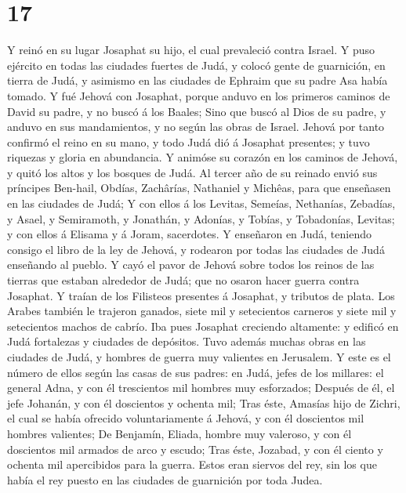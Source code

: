 \hypertarget{section-16}{%
\section{17}\label{section-16}}

 Y reinó en su lugar Josaphat su hijo, el cual prevaleció
contra Israel.  Y puso ejército en todas las ciudades
fuertes de Judá, y colocó gente de guarnición, en tierra de Judá, y
asimismo en las ciudades de Ephraim que su padre Asa había tomado.
 Y fué Jehová con Josaphat, porque anduvo en los primeros
caminos de David su padre, y no buscó á los Baales;  Sino
que buscó al Dios de su padre, y anduvo en sus mandamientos, y no según
las obras de Israel.  Jehová por tanto confirmó el reino en
su mano, y todo Judá dió á Josaphat presentes; y tuvo riquezas y gloria
en abundancia.  Y animóse su corazón en los caminos de
Jehová, y quitó los altos y los bosques de Judá.  Al tercer
año de su reinado envió sus príncipes Ben-hail, Obdías, Zachârías,
Nathaniel y Michêas, para que enseñasen en las ciudades de Judá;
 Y con ellos á los Levitas, Semeías, Nethanías, Zebadías, y
Asael, y Semiramoth, y Jonathán, y Adonías, y Tobías, y Tobadonías,
Levitas; y con ellos á Elisama y á Joram, sacerdotes.  Y
enseñaron en Judá, teniendo consigo el libro de la ley de Jehová, y
rodearon por todas las ciudades de Judá enseñando al pueblo.
 Y cayó el pavor de Jehová sobre todos los reinos de las
tierras que estaban alrededor de Judá; que no osaron hacer guerra contra
Josaphat.  Y traían de los Filisteos presentes á Josaphat,
y tributos de plata. Los Arabes también le trajeron ganados, siete mil y
setecientos carneros y siete mil y setecientos machos de cabrío.
 Iba pues Josaphat creciendo altamente: y edificó en Judá
fortalezas y ciudades de depósitos.  Tuvo además muchas
obras en las ciudades de Judá, y hombres de guerra muy valientes en
Jerusalem.  Y este es el número de ellos según las casas de
sus padres: en Judá, jefes de los millares: el general Adna, y con él
trescientos mil hombres muy esforzados;  Después de él, el
jefe Johanán, y con él doscientos y ochenta mil;  Tras
éste, Amasías hijo de Zichri, el cual se había ofrecido voluntariamente
á Jehová, y con él doscientos mil hombres valientes;  De
Benjamín, Eliada, hombre muy valeroso, y con él doscientos mil armados
de arco y escudo;  Tras éste, Jozabad, y con él ciento y
ochenta mil apercibidos para la guerra.  Estos eran siervos
del rey, sin los que había el rey puesto en las ciudades de guarnición
por toda Judea.

